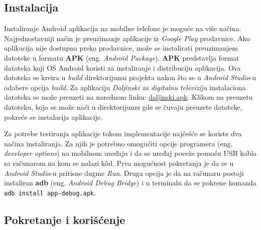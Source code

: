 \documentclass[implementacija.tex]{subfiles}
\begin{document}
\subsection{Instalacija}
Instaliranje Android aplikacija na mobilne telefone je moguće na više načina. Najjednostavniji način je preuzimanje aplikacije iz \textit{Google Play} prodavnice. Ako aplikacija nije dostupna preko prodavnice, može se instalirati preuzimanjem datoteke u formatu \textbf{APK} (eng. \textit{Android Package}). \textbf{APK} predstavlja format datoteka koji OS Android koristi za instaliranje i distribuciju aplikacija. Ova datoteka se kreira u \textit{build} direktorijumu projekta nakon što se u \textit{Android Studio}-u odabere opcija \textit{build}. Za aplikaciju \textit{Daljinski za digitalnu televiziju} instalaciona datoteka se može preuzeti na narednom linku: \href{https://drive.google.com/file/d/1gBlfRibn4jrFDe3TTBCsHUq9MDowEBty/view?usp=drive_link}{daljinski.apk}. Klikom na preuzetu datoteku, koja se može naći u direktorijumu gde se čuvaju preuzete datoteke, pokreće se instalacija aplikacije.

Za potrebe testiranja aplikacije tokom implementacije najčešće se koriste dva načina instaliranja. Za njih je potrebno omogućiti opcije programera (eng. \textit{developer options}) na mobilnom uređaju i da se uređaj poveže pomoću USB kabla sa računarom na kom se nalazi k\^{o}d. Prva mogućnost pokretanja je da se u \textit{Android Studio}-u pritisne dugme \textit{Run}. Druga opcija je da na računaru postoji instaliran \textbf{adb} (eng. \textit{Android Debug Bridge}) i u terminalu da se pokrene komanda \verb|adb install app-debug.apk|. 

\subsection{Pokretanje i korišćenje}
\end{document}
